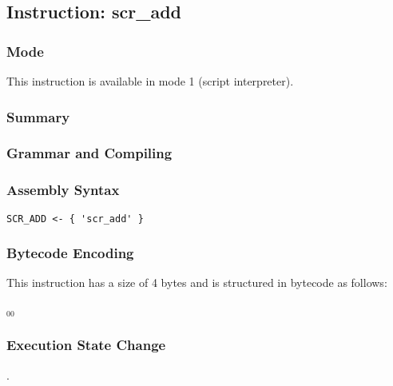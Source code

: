 \subsection{Instruction: scr\_add}

\subsubsection{Mode}
This instruction is available in mode 1 (script interpreter).
\subsubsection{Summary}


\subsubsection{Grammar and Compiling}


\subsubsection{Assembly Syntax}

\begin{myquote}
\begin{verbatim}
SCR_ADD <- { 'scr_add' }
\end{verbatim}
\end{myquote}

\subsubsection{Bytecode Encoding}

This instruction has a size of 4 bytes and is structured in bytecode as follows:

$_{00}$\ 

\subsubsection{Execution State Change}

.


